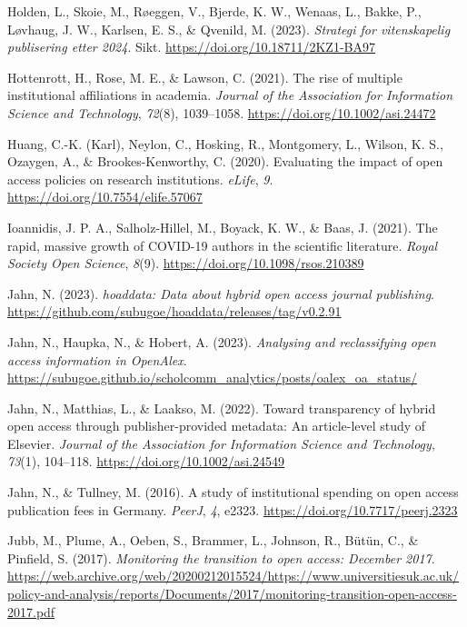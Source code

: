 \documentclass[a4paper,man,floatsintext,longtable,noextraspace,12pt]{apa6}
\newlength{\cslhangindent}
\newenvironment{CSLReferences}[2] %
  {\begin{list}{}{%
   \setlength{\itemindent}{0pt}
   \setlength{\leftmargin}{0pt}
   \setlength{\parsep}{0pt}
   \ifodd #1
    \setlength{\leftmargin}{\cslhangindent}
    \setlength{\itemindent}{-1\cslhangindent}
   \fi
   \setlength{\itemsep}{#2\baselineskip}}}
  {\end{list}}
\begin{document}
\begin{CSLReferences}{1}{0}
Holden, L., Skoie, M., Røeggen, V., Bjerde, K. W., Wenaas, L., Bakke,
P., Løvhaug, J. W., Karlsen, E. S., \& Qvenild, M. (2023).
\emph{Strategi for vitenskapelig publisering etter 2024}. Sikt.
\url{https://doi.org/10.18711/2KZ1-BA97}

Hottenrott, H., Rose, M. E., \& Lawson, C. (2021). The rise of multiple
institutional affiliations in academia. \emph{Journal of the Association
for Information Science and Technology}, \emph{72}(8), 1039--1058.
\url{https://doi.org/10.1002/asi.24472}

Huang, C.-K. (Karl), Neylon, C., Hosking, R., Montgomery, L., Wilson, K.
S., Ozaygen, A., \& Brookes-Kenworthy, C. (2020). Evaluating the impact
of open access policies on research institutions. \emph{{eLife}},
\emph{9}. \url{https://doi.org/10.7554/elife.57067}

Ioannidis, J. P. A., Salholz-Hillel, M., Boyack, K. W., \& Baas, J.
(2021). The rapid, massive growth of COVID-19 authors in the scientific
literature. \emph{Royal Society Open Science}, \emph{8}(9).
\url{https://doi.org/10.1098/rsos.210389}

Jahn, N. (2023). \emph{{hoaddata}: Data about hybrid open access journal
publishing}.
\url{https://github.com/subugoe/hoaddata/releases/tag/v0.2.91}

Jahn, N., Haupka, N., \& Hobert, A. (2023). \emph{Analysing and
reclassifying open access information in OpenAlex}.
\url{https://subugoe.github.io/scholcomm_analytics/posts/oalex_oa_status/}

Jahn, N., Matthias, L., \& Laakso, M. (2022). Toward transparency of
hybrid open access through publisher-provided metadata: An article-level
study of {Elsevier}. \emph{Journal of the Association for Information
Science and Technology}, \emph{73}(1), 104--118.
\url{https://doi.org/10.1002/asi.24549}

Jahn, N., \& Tullney, M. (2016). A study of institutional spending on
open access publication fees in {Germany}. \emph{{PeerJ}}, \emph{4},
e2323. \url{https://doi.org/10.7717/peerj.2323}

Jubb, M., Plume, A., Oeben, S., Brammer, L., Johnson, R., Bütün, C., \&
Pinfield, S. (2017). \emph{Monitoring the transition to open access:
December 2017}.
\url{https://web.archive.org/web/20200212015524/https://www.universitiesuk.ac.uk/policy-and-analysis/reports/Documents/2017/monitoring-transition-open-access-2017.pdf}


\end{CSLReferences}
\end{document}
